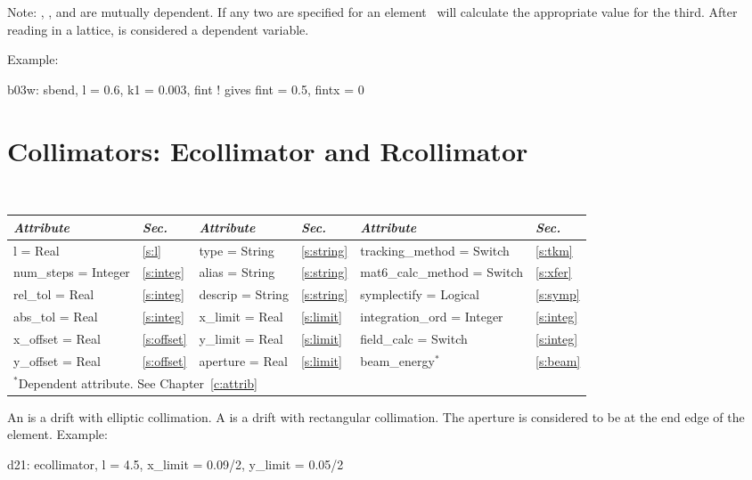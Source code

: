 Note: , , and  are mutually dependent. If any two are
specified for an element \bmad\ will calculate the appropriate value
for the third.  After reading in a lattice,  is considered a
dependent variable.

Example:
\begin{example}
  b03w: sbend, l = 0.6, k1 = 0.003, fint  ! gives fint = 0.5, fintx = 0
\end{example}

\section{Collimators: Ecollimator and Rcollimator}
\label{s:col}

\begin{center}
\tt
\begin{tabular}{|l|l||l|l||l|l|} \hline
  {\sl Attribute} & {\sl Sec.}  & {\sl Attribute} & {\sl Sec.} & {\sl Attribute} & {\sl Sec.} \\ \hline
  l        = Real       & \ref{s:l}      & type = String                & \ref{s:string} & tracking\_method = Switch    & \ref{s:tkm}   \\ \hline
  num\_steps = Integer  & \ref{s:integ}  & alias = String               & \ref{s:string} & mat6\_calc\_method = Switch  & \ref{s:xfer}  \\ \hline
  rel\_tol = Real       & \ref{s:integ}  & descrip = String             & \ref{s:string} & symplectify = Logical        & \ref{s:symp}  \\ \hline
  abs\_tol = Real       & \ref{s:integ}  & x\_limit = Real              & \ref{s:limit}  & integration\_ord = Integer   & \ref{s:integ} \\ \hline
  x\_offset  = Real     & \ref{s:offset} & y\_limit = Real              & \ref{s:limit}  & field\_calc = Switch         & \ref{s:integ} \\ \hline
  y\_offset  = Real     & \ref{s:offset} & aperture = Real              & \ref{s:limit}  & beam\_energy$^*$             & \ref{s:beam}  \\ \hline
  \multicolumn{6}{l}{\small $^*$Dependent attribute. See Chapter~\ref{c:attrib}} \\
\end{tabular}
\end{center}
\toffset

An  is a drift with elliptic collimation.
A  is a drift with rectangular collimation.
The aperture is considered to be at the end edge of the element.
Example:
\begin{example}
  d21: ecollimator, l = 4.5, x_limit = 0.09/2, y_limit = 0.05/2
\end{example}

